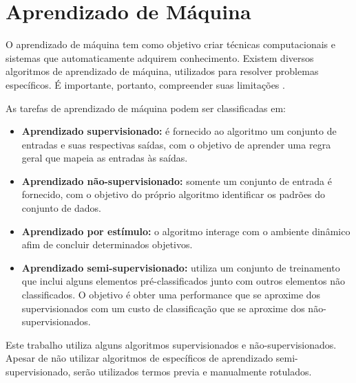 \clearpage
\chapter{Aprendizado de Máquina}

O aprendizado de máquina tem como objetivo criar técnicas computacionais e sistemas que automaticamente adquirem conhecimento. Existem diversos algoritmos de aprendizado de máquina, utilizados para resolver problemas específicos. É importante, portanto, compreender suas limitações \cite{rezende2003}.

As tarefas de aprendizado de máquina podem ser classificadas em:

\begin{itemize}
    \item \textbf{Aprendizado supervisionado:} é fornecido ao algoritmo um conjunto de entradas e suas respectivas saídas, com o objetivo de aprender uma regra geral que mapeia as entradas às saídas.
    \item \textbf{Aprendizado não-supervisionado:} somente um conjunto de entrada é fornecido, com o objetivo do próprio algoritmo identificar os padrões do conjunto de dados.
    \item \textbf{Aprendizado por estímulo:} o algoritmo interage com o ambiente dinâmico afim de concluir determinados objetivos.
    \item \textbf{Aprendizado semi-supervisionado:} utiliza um conjunto de treinamento que inclui alguns elementos pré-classificados junto com outros elementos não classificados. O objetivo é obter uma performance que se aproxime dos supervisionados com um custo de classificação que se aproxime dos não-supervisionados.
\end{itemize}

Este trabalho utiliza alguns algoritmos supervisionados e não-supervisionados. Apesar de não utilizar algoritmos de específicos de aprendizado semi-supervisionado, serão utilizados termos previa e manualmente rotulados.







